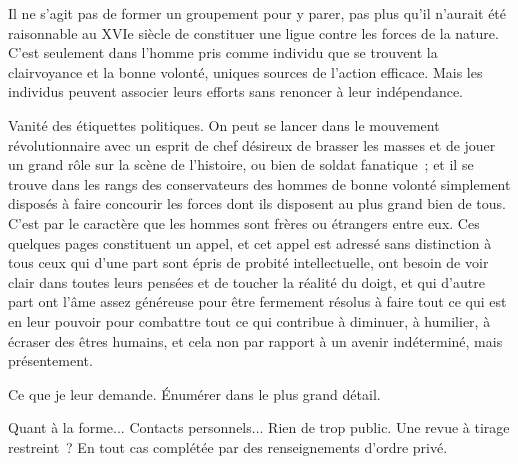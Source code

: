 \documentclass[french,twoside]{book} %
\begin{document}
Il ne s'agit pas de former un groupement pour y parer, pas plus qu'il n'aurait été raisonnable au XVIe siècle de constituer une ligue contre les forces de la nature. C'est seulement dans l'homme pris comme individu que se trouvent la clairvoyance et la bonne volonté, uniques sources de l'action efficace. Mais les individus peuvent associer leurs efforts sans renoncer à leur indépendance.\par
Vanité des étiquettes politiques. On peut se lancer dans le mouvement révolutionnaire avec un esprit de chef désireux de brasser les masses et de jouer un grand rôle sur la scène de l'histoire, ou bien de soldat fanatique ; et il se trouve dans les rangs des conservateurs des hommes de bonne volonté simplement disposés à faire concourir les forces dont ils disposent au plus grand bien de tous. C'est par le caractère que les hommes sont frères ou étrangers entre eux. Ces quelques pages constituent un appel, et cet appel est adressé sans distinction à tous ceux qui d'une part sont épris de probité intellectuelle, ont besoin de voir clair dans toutes leurs pensées et de toucher la réalité du doigt, et qui d'autre part ont l'âme assez généreuse pour être fermement résolus à faire tout ce qui est en leur pouvoir pour combattre tout ce qui contribue à diminuer, à humilier, à écraser des êtres humains, et cela non par rapport à un avenir indéterminé, mais présentement.\par
Ce que je leur demande. Énumérer dans le plus grand détail.\par
Quant à la forme... Contacts personnels... Rien de trop public. Une revue à tirage restreint ? En tout cas complétée par des renseignements d'ordre privé.
\end{document}
